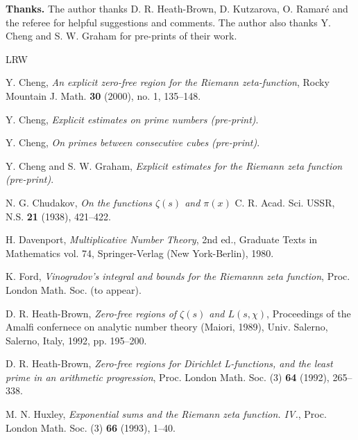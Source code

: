 \documentclass[10pt]{amsart}
\theoremstyle{remark}
\theoremstyle{plain}
\numberwithin{equation}{section}
\theoremstyle{definition}
\begin{document}
\bigskip
{\bf Thanks.}
The author thanks D. R. Heath-Brown, D. Kutzarova, 
O. Ramar\'e and the referee for helpful suggestions and comments.
The author also thanks
Y. Cheng and S. W. Graham for pre-prints of their work.

%
%
%
 
\begin{thebibliography}{LRW} 
 


 Y. Cheng,
{\it An explicit zero-free region for the Riemann zeta-function},
 Rocky Mountain J. Math. {\bf 30} (2000), no. 1,  135--148.

 Y. Cheng, {\it Explicit estimates on prime numbers
 (pre-print)}.

 Y. Cheng, 
{\it On primes between consecutive cubes (pre-print)}.

  Y. Cheng and S. W. Graham, {\it 
Explicit estimates for the Riemann zeta function (pre-print)}.

  N. G. Chudakov,
 {\it On the functions $\zeta(s)$ and $\pi(x)$}
 C. R. Acad. Sci. USSR, N.S. {\bf 21} (1938), 421--422.

  H. Davenport, {\it Multiplicative Number Theory},
2nd ed., Graduate Texts in Mathematics vol. 74, Springer-Verlag
(New York-Berlin), 1980.

  K. Ford, {\it Vinogradov's integral and bounds for
the Riemannn zeta function}, Proc. London Math. Soc. (to appear).

  D. R. Heath-Brown,  {\it Zero-free regions of $\zeta(s)$
and $L(s,\chi)$}, Proceedings of the Amalfi confernece on analytic
number theory (Maiori, 1989), Univ. Salerno, Salerno, Italy,
1992, pp.  195--200.

 D. R. Heath-Brown,
 {\it Zero-free regions for Dirichlet L-functions,
and the least prime in an arithmetic progression}, Proc. London Math.
Soc. (3) {\bf 64} (1992),  265--338.

 M. N. Huxley, {\it Exponential sums and the Riemann zeta function. IV.},
Proc. London Math. Soc. (3) {\bf 66} (1993), 1--40.



\end{thebibliography}
\end{document}
